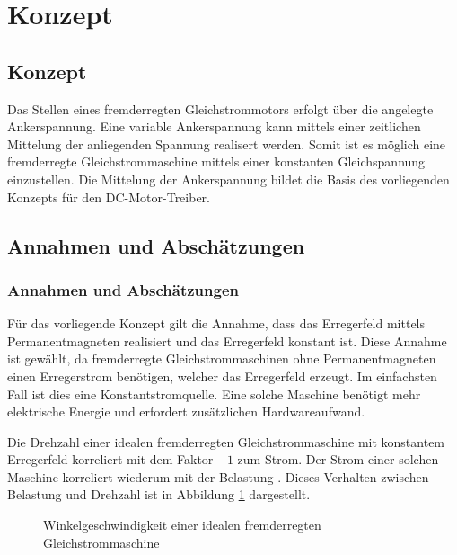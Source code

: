 \ifSTANDALONE
\section{Konzept}
\fi
\ifEMBED
\subsection{Konzept}
\fi

Das Stellen eines fremderregten Gleichstrommotors erfolgt über die
angelegte Ankerspannung. Eine variable Ankerspannung kann mittels einer 
zeitlichen Mittelung der anliegenden Spannung realisert werden. Somit
ist es möglich eine fremderregte Gleichstrommaschine mittels einer
konstanten Gleichspannung einzustellen. Die Mittelung der Ankerspannung
bildet die Basis des vorliegenden Konzepts für den DC-Motor-Treiber.

\ifSTANDALONE
\subsection{Annahmen und Abschätzungen}\label{sec:annahmen}
\fi
\ifEMBED
\subsubsection{Annahmen und Abschätzungen}\label{sec:annahmen}
\fi
Für das vorliegende Konzept gilt die Annahme, dass das Erregerfeld mittels
Permanentmagneten realisiert und das Erregerfeld konstant ist. Diese
Annahme ist gewählt, da fremderregte Gleichstrommaschinen ohne
Permanentmagneten einen Erregerstrom benötigen, welcher das Erregerfeld
erzeugt. Im einfachsten Fall ist dies eine Konstantstromquelle. Eine solche
Maschine benötigt mehr elektrische Energie und erfordert zusätzlichen
Hardwareaufwand.

\noindent Die Drehzahl einer idealen fremderregten Gleichstrommaschine mit 
konstantem Erregerfeld korreliert mit dem Faktor $-1$ zum Strom. Der Strom 
einer solchen Maschine korreliert wiederum mit der Belastung 
\cite[p.163]{smps}. Dieses Verhalten zwischen Belastung und Drehzahl ist in 
Abbildung \ref{fig:ideal-dc-curve} dargestellt.

\begin{figure}[h!]
    \centering
    \caption{Winkelgeschwindigkeit einer idealen fremderregten 
        Gleichstrommaschine}
    \label{fig:ideal-dc-curve}
\end{figure}

